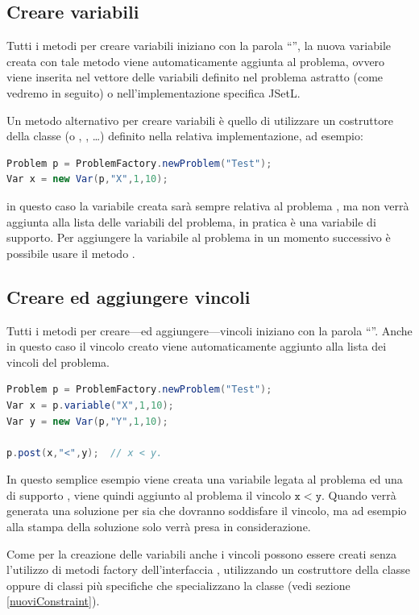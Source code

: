 \subsection{Creare variabili}
Tutti i metodi per creare variabili iniziano con la parola ``'',
la nuova variabile creata con tale metodo viene automaticamente aggiunta 
al problema, ovvero viene inserita nel vettore delle variabili definito
nel problema astratto (come vedremo in seguito) o nell'implementazione
specifica JSetL.

Un metodo alternativo per creare variabili è quello di utilizzare un costruttore
della classe  (o , , \ldots) definito
nella relativa implementazione, ad esempio:
\begin{lstlisting}[language = Java, frame = single]
Problem p = ProblemFactory.newProblem("Test");
Var x = new Var(p,"X",1,10);
\end{lstlisting}
in questo caso la variabile creata sarà sempre relativa al problema ,
ma non verrà aggiunta alla lista delle variabili del problema, in pratica è
una variabile di supporto. Per aggiungere la variabile al problema in un 
momento successivo è possibile usare il metodo .

\subsection{Creare ed aggiungere vincoli}
Tutti i metodi per creare---ed aggiungere---vincoli iniziano con la parola 
``''. Anche in questo caso il vincolo creato viene automaticamente
aggiunto alla lista dei vincoli del problema. 
\begin{lstlisting}[language = Java, frame = single]
Problem p = ProblemFactory.newProblem("Test");
Var x = p.variable("X",1,10);
Var y = new Var(p,"Y",1,10);

p.post(x,"<",y);  // x < y.
\end{lstlisting}
In questo semplice esempio viene creata una variabile  legata al 
problema  ed una di supporto , viene quindi aggiunto al problema
il vincolo $\mathtt{x} < \mathtt{y}$. Quando verrà generata una soluzione
per  sia  che  dovranno soddisfare il vincolo, ma
ad esempio alla stampa della soluzione solo  verrà presa in 
considerazione.

Come per la creazione delle variabili anche i vincoli possono essere creati
senza l'utilizzo di metodi factory dell'interfaccia ,
utilizzando un costruttore della classe  oppure
di classi più specifiche che specializzano la classe  
(vedi sezione \ref{nuoviConstraint}).

